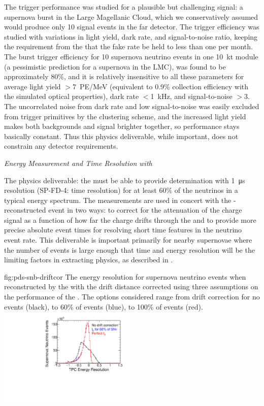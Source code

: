 The  trigger performance was studied for a plausible but challenging signal: a supernova burst in the Large Magellanic Cloud, which we conservatively assumed would produce only 10 signal events in the far detector. The trigger efficiency was studied with variations in light yield, dark rate, and signal-to-noise ratio, keeping the requirement from the  that the fake rate be held to less than one per month. The burst trigger efficiency for 10 supernova neutrino events in one \SI{10}{kt} module (a pessimistic prediction for a supernova in the LMC), was found to be approximately $80\%$, and it is relatively insensitive to all these parameters for average light yield $>$\SI{7}{PE/MeV} (equivalent to 0.9\% collection efficiency with the simulated optical properties), dark rate $<$\SI{1}{kHz}, and signal-to-noise $>3$. The uncorrelated noise from dark rate and low signal-to-noise was easily excluded from trigger primitives by the clustering scheme, and the increased light yield makes both backgrounds and signal brighter together, so performance stays basically constant. Thus this physics deliverable, while important, does not constrain any detector requirements.


\textit{ Energy Measurement and Time Resolution with \tzero}\nopagebreak

The physics deliverable: the  must be able to provide \tzero determination with \SI{1}{\micro s} resolution (SP-FD-4: time resolution) for at least 60\% of the neutrinos in a typical  energy spectrum. The \tzero measurements are used in concert with the -reconstructed event in two ways: to correct for the attenuation of the charge signal as a function of how far the charge drifts through the  and to provide more precise absolute event times for resolving short time features in the  neutrino event rate. This deliverable is important primarily for nearby supernovae where the number of events is large enough that time and energy resolution will be the limiting factors in extracting physics, as described in \physchsnb{}. 

\begin{dunefigure}
{fig:pds-snb-driftcor}
{The energy resolution for supernova neutrino events when reconstructed by the  with the drift distance corrected using three assumptions on the performance of the . The options considered range from drift correction for no events (black), to 60\% of events (blue), to 100\% of events (red).
}
  \includegraphics[width=0.5\textwidth]{graphics/pds-snb-drift-corr}
 \end{dunefigure}

